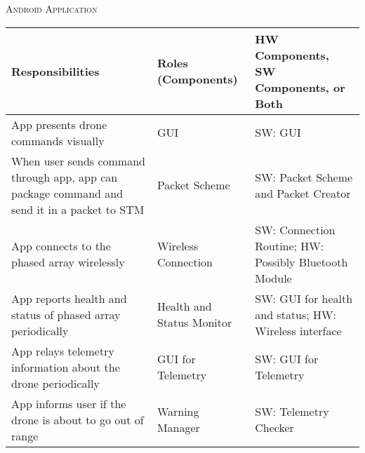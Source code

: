 \documentclass[RRC.tex]{subfiles}
\begin{document}
\bigskip

\begin{center}
	\textsc{\Large Android Application}
	\hrulefill
	\begin{tabular}{ | p{5cm} | p{5cm} | p{5cm} |}
		\hline
		Responsibilities & Roles (Components) & HW Components, SW Components, or Both \\ \hline
		App presents drone commands visually & GUI & SW: GUI \\ \hline
		When user sends command through app, app can package command and send it in a packet to STM & Packet Scheme & SW: Packet Scheme and Packet Creator \\ \hline
		App connects to the phased array wirelessly & Wireless Connection & SW: Connection Routine; HW: Possibly Bluetooth Module \\ \hline
		App reports health and status of phased array periodically & Health and Status Monitor & SW: GUI for health and status; HW: Wireless interface \\ \hline
		App relays telemetry information about the drone periodically & GUI for Telemetry & SW: GUI for Telemetry \\ \hline
		App informs user if the drone is about to go out of range & Warning Manager & SW: Telemetry Checker \\ \hline
		
	\end{tabular}
\end{center}
\end{document}
